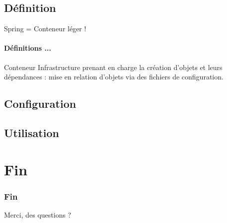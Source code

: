 \documentclass[compress]{beamer}%
\begin{document}
\subsection{Définition}


\begin{frame}{Spring = Conteneur léger !}
	\framesubtitle{Définitions ...}
	
	\begin{block}{Conteneur}
	Infrastructure prenant en charge la création d'objets et leurs dépendances : mise en relation d'objets via des fichiers de configuration.
	\end{block}

\end{frame}


\subsection{Configuration}



\subsection{Utilisation}




\section*{Fin}

\begin{frame}
	\frametitle{Fin}
	\begin{center}
		\huge
		Merci, des questions ?
	\end{center}
\end{frame}
\end{document}
